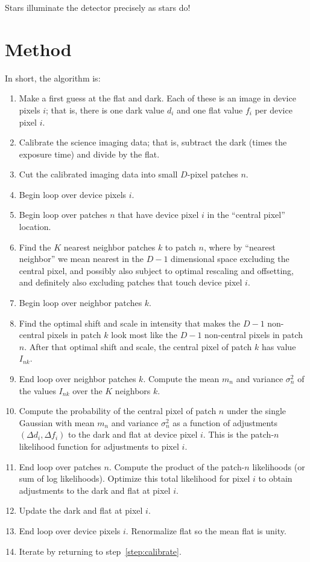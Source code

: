 \documentclass[12pt,preprint,pdftex]{aastex}
\begin{document}
Stars illuminate the detector precisely as stars do!

\section{Method}

In short, the algorithm is:
\begin{enumerate}
\item Make a first guess at the flat and dark.  Each of these is an image in device pixels $i$; that is, there is one dark value $d_i$ and one flat value $f_i$ per device pixel $i$.
\item Calibrate the science imaging data; that is, subtract the dark (times the exposure time) and divide by the flat.\label{step:calibrate}
\item Cut the calibrated imaging data into small $D$-pixel patches $n$.
\item Begin loop over device pixels $i$.
\item Begin loop over patches $n$ that have device pixel $i$ in the ``central pixel'' location.
\item Find the $K$ nearest neighbor patches $k$ to patch $n$, where by ``nearest neighbor'' we mean nearest in the $D-1$ dimensional space excluding the central pixel, and possibly also subject to optimal rescaling and offsetting, and definitely also excluding patches that touch device pixel $i$.
\item Begin loop over neighbor patches $k$.
\item Find the optimal shift and scale in intensity that makes the $D-1$ non-central pixels in patch $k$ look most like the $D-1$ non-central pixels in patch $n$.  After that optimal shift and scale, the central pixel of patch $k$ has value $I_{nk}$.
\item End loop over neighbor patches $k$.  Compute the mean $m_n$ and variance $\sigma^2_n$ of the values $I_{nk}$ over the $K$ neighbors $k$.
\item Compute the probability of the central pixel of patch $n$ under the single Gaussian with mean $m_n$ and variance $\sigma^2_n$ as a function of adjustments $(\Delta d_i, \Delta f_i)$ to the dark and flat at device pixel $i$.  This is the patch-$n$ likelihood function for adjustments to pixel $i$.
\item End loop over patches $n$.  Compute the product of the patch-$n$ likelihoods (or sum of log likelihoods).  Optimize this total likelihood for pixel $i$ to obtain adjustments to the dark and flat at pixel $i$.
\item Update the dark and flat at pixel $i$.
\item End loop over device pixels $i$.  Renormalize flat so the mean flat is unity.
\item Iterate by returning to step~\ref{step:calibrate}.
\end{enumerate}
\end{document}
